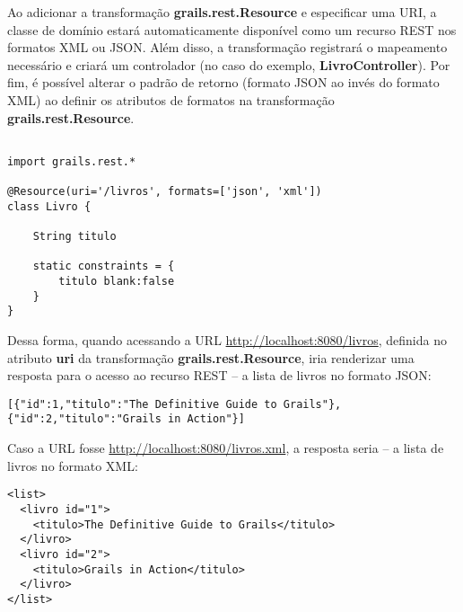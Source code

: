 \vspace{0.2cm}

Ao adicionar a transformação {\bf grails.rest.Resource} e especificar uma URI, a
classe de  domínio estará  automaticamente disponível como  um recurso  REST nos
formatos  XML ou  JSON.  Além  disso, a  transformação  registrará o  mapeamento
necessário   e    criará   um   controlador   (no   caso    do   exemplo,   {\bf
  LivroController}). Por  fim, é possível  alterar o padrão de  retorno (formato
JSON  ao  invés  do  formato  XML)  ao  definir  os  atributos  de  formatos  na
transformação {\bf grails.rest.Resource}.

\begin{lstlisting}[caption=Classe de domínio -- recurso REST, frame = trBL,
    float=htbp, label=codREST] 

import grails.rest.*

@Resource(uri='/livros', formats=['json', 'xml'])
class Livro {

    String titulo

    static constraints = {
        titulo blank:false
    }
}
\end{lstlisting}

Dessa forma, quando acessando a URL \url{http://localhost:8080/livros}, definida
no  atributo  {\bf  uri}   da  transformação  {\bf  grails.rest.Resource},  iria
renderizar uma resposta  para o acesso ao  recurso REST -- a lista  de livros no
formato JSON: 

\vspace{0.5cm}

\begin{cBox}
\begin{scriptsize}
\begin{verbatim}
[{"id":1,"titulo":"The Definitive Guide to Grails"},{"id":2,"titulo":"Grails in Action"}]
\end{verbatim}
\end{scriptsize}
\end{cBox}

\vspace{0.5cm}

Caso a  URL fosse \url{http://localhost:8080/livros.xml}, a resposta  seria -- a
lista de livros no formato XML:

\vspace{0.5cm}

\begin{cBox}
\begin{scriptsize}
\begin{verbatim}
<list>
  <livro id="1">
    <titulo>The Definitive Guide to Grails</titulo>
  </livro>
  <livro id="2">
    <titulo>Grails in Action</titulo>
  </livro>
</list>
\end{verbatim}
\end{scriptsize}
\end{cBox}

